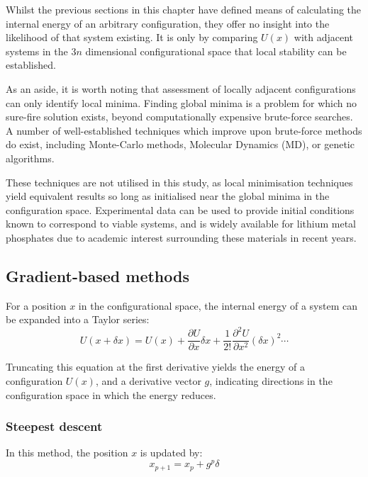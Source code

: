 Whilst the previous sections in this chapter have defined means of calculating the internal energy of an arbitrary configuration, they offer no insight into the likelihood of that system existing.
It is only by comparing $U(x)$ with adjacent systems in the $3n$ dimensional configurational space that local stability can be established.


As an aside, it is worth noting that assessment of locally adjacent configurations can only identify local minima.
Finding global minima is a problem for which no sure-fire solution exists, beyond computationally expensive brute-force searches.
A number of well-established techniques which improve upon brute-force methods do exist, including Monte-Carlo methods,\cite{Allan2001} Molecular Dynamics (MD), or genetic algorithms. \cite{Barnes1992}

These techniques are not utilised in this study, as local minimisation techniques yield equivalent results so long as initialised near the global minima in the configuration space.
Experimental data can be used to provide initial conditions known to correspond to viable systems, and is widely available for lithium metal phosphates due to academic interest surrounding these materials in recent years.

\subsection{Gradient-based methods}

For a position $x$ in the configurational space, the internal energy of a system can be expanded into a Taylor series:
\begin{equation}
  U(x+\delta x) = U(x) + \frac{\partial U}{\partial x} \delta x + \frac{1}{2!} \frac{\partial ^2 U}{\partial x^2}(\delta x)^2 \cdots
\end{equation}

Truncating this equation at the first derivative yields the energy of a configuration $U(x)$, and a derivative vector $g$, indicating directions in the configuration space in which the energy reduces.

\subsubsection{Steepest descent}
In this method, the position $x$ is updated by:
\begin{equation}
x_{p+1} = x_p + g^p\delta
\end{equation}

